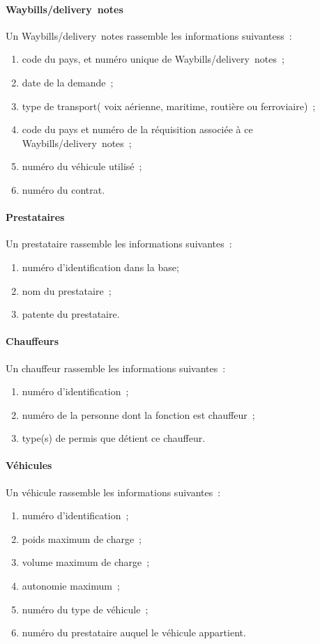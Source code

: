 \paragraph{Waybills/delivery~notes}
Un Waybills/delivery~notes rassemble les informations suivantess~:
\begin{enumerate}
	\item code du pays, et numéro unique de Waybills/delivery~notes~;
	\item date de la demande~;
	\item type de transport( voix aérienne, maritime, routière ou ferroviaire)~;
	\item code du pays et numéro de la réquisition associée à ce Waybills/delivery~notes~; 
	\item numéro du véhicule utilisé~; 
	\item numéro du contrat.
\end{enumerate}

\paragraph{Prestataires}
Un prestataire rassemble les informations suivantes~:
\begin{enumerate}
	\item numéro d'identification dans la base;
	\item nom du prestataire~;
	\item patente  du prestataire.
\end{enumerate}

\paragraph{Chauffeurs}
Un chauffeur rassemble les informations suivantes~:
\begin{enumerate}
	\item numéro d'identification~;
	\item numéro de la personne dont la fonction est chauffeur~;
	\item type(s) de permis que détient ce chauffeur. 
\end{enumerate}

\paragraph{Véhicules}
Un véhicule rassemble les informations suivantes~:
\begin{enumerate}
	\item numéro d'identification~;
	\item poids maximum de charge~;
	\item volume maximum de charge~;
	\item autonomie maximum~;
	\item numéro du type de véhicule~;
	\item numéro du prestataire auquel le véhicule appartient.
\end{enumerate}
